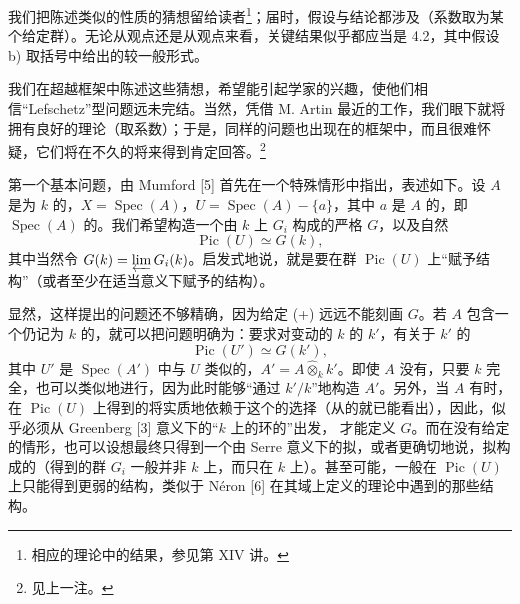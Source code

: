我们把陈述类似的性质的猜想留给读者\footnote{相应的理论中的结果，参见第 XIV 讲。}；届时，假设与结论都涉及（系数取为某个给定群）。无论从观点还是从观点来看，关键结果似乎都应当是 4.2，其中假设 b) 取括号中给出的较一般形式。

我们在超越框架中陈述这些猜想，希望能引起学家的兴趣，使他们相信“Lefschetz”型问题远未完结。当然，凭借 M. Artin 最近的工作，我们眼下就将拥有良好的理论（取系数）；于是，同样的问题也出现在的框架中，而且很难怀疑，它们将在不久的将来得到肯定回答。\footnote{见上一注。}

第一个基本问题，由 Mumford [5] 首先在一个特殊情形中指出，表述如下。设 $A$ 是为 $k$ 的，$X=\operatorname{Spec}(A)$，$U=\operatorname{Spec}(A)-\{a\}$，其中 $a$ 是 $A$ 的，即 $\operatorname{Spec}(A)$ 的。我们希望构造一个由 $k$ 上 $G_i$ 构成的严格 $G$，以及自然
\[
\operatorname{Pic}(U)\simeq G(k),\tag{+}
\]
其中当然令 $G(k)=\varprojlim G_i(k)$。启发式地说，就是要在群 $\operatorname{Pic}(U)$ 上“赋予结构”（或者至少在适当意义下赋予的结构）。

显然，这样提出的问题还不够精确，因为给定 (+) 远远不能刻画 $G$。若 $A$ 包含一个仍记为 $k$ 的，就可以把问题明确为：要求对变动的 $k$ 的 $k'$，有关于 $k'$ 的
\[
\operatorname{Pic}(U')\simeq G(k'),\tag{+'}
\]
其中 $U'$ 是 $\operatorname{Spec}(A')$ 中与 $U$ 类似的，$A'=A\widehat\otimes_k k'$。即使 $A$ 没有，只要 $k$ 完全，也可以类似地进行，因为此时能够“通过 $k'/k$”地构造 $A'$。另外，当 $A$ 有时，在 $\operatorname{Pic}(U)$ 上得到的将实质地依赖于这个的选择（从的就已能看出），因此，似乎必须从 Greenberg [3] 意义下的“$k$ 上的环的”出发，
才能定义 $G$。而在没有给定的情形，也可以设想最终只得到一个由 Serre 意义下的拟，或者更确切地说，拟构成的（得到的群 $G_i$ 一般并非 $k$ 上，而只在 $k$ 上）。甚至可能，一般在 $\operatorname{Pic}(U)$ 上只能得到更弱的结构，类似于 Néron [6] 在其域上定义的理论中遇到的那些结构。

